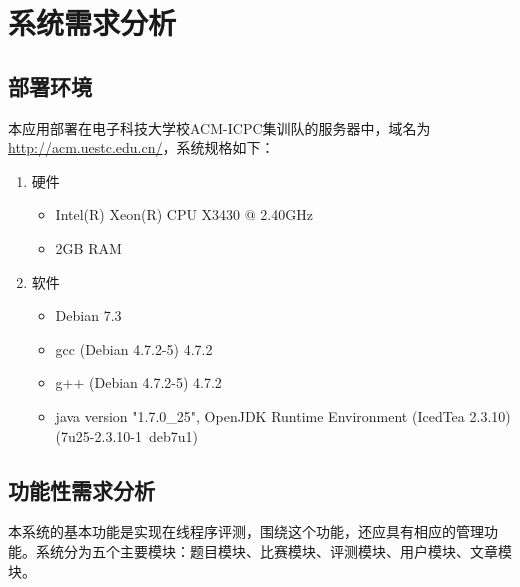 
\chapter{系统需求分析}
\section{部署环境}
本应用部署在电子科技大学校ACM-ICPC集训队的服务器中，域名为\url{http://acm.uestc.edu.cn/}，系统规格如下：
\begin{enumerate}
	\item 硬件
	\begin{itemize}
		\item Intel(R) Xeon(R) CPU X3430 @ 2.40GHz
		\item 2GB RAM
	\end{itemize}
	\item 软件
	\begin{itemize}
		\item Debian 7.3
		\item gcc (Debian 4.7.2-5) 4.7.2
		\item g++ (Debian 4.7.2-5) 4.7.2
		\item java version "1.7.0\_25", OpenJDK Runtime Environment (IcedTea 2.3.10) (7u25-2.3.10-1~deb7u1)
	\end{itemize}
\end{enumerate}

\section{功能性需求分析}
本系统的基本功能是实现在线程序评测，围绕这个功能，还应具有相应的管理功能。系统分为五个主要模块：题目模块、比赛模块、评测模块、用户模块、文章模块。


